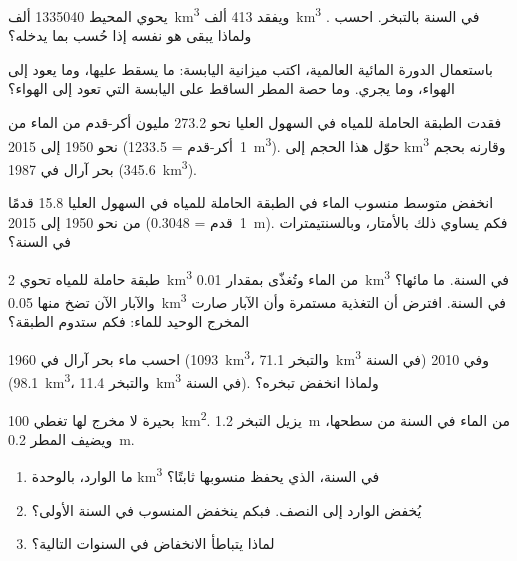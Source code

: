 \begin{exercise}[$\star\star$]\label{exo:g10:freshwater-resources:7}
يحوي المحيط \num{1335040} ألف~\unit{km^3} ويفقد
\num{413} ألف~\unit{km^3} في السنة بالتبخر. احسب . ولماذا يبقى هو نفسه إذا حُسب بما يدخله؟
\end{exercise}

\begin{exercise}[$\star\star$]\label{exo:g10:freshwater-resources:8}
باستعمال  الدورة المائية العالمية، اكتب ميزانية اليابسة: ما
يسقط عليها، وما يعود إلى الهواء، وما يجري. وما حصة المطر
الساقط على اليابسة التي تعود إلى الهواء؟
\end{exercise}

\begin{exercise}[$\star\star$]\label{exo:g10:freshwater-resources:9}
فقدت الطبقة الحاملة للمياه في السهول العليا نحو \num{273.2} مليون أكر-قدم من الماء
من نحو 1950 إلى 2015 (\num{1}~أكر-قدم = \qty{1233.5}{m^3}). حوّل
هذا الحجم إلى \unit{km^3} وقارنه بحجم بحر آرال في
1987 (\qty{345.6}{km^3}).
\end{exercise}

\begin{exercise}[$\star\star$]\label{exo:g10:freshwater-resources:10}
انخفض متوسط منسوب الماء في الطبقة الحاملة للمياه في السهول العليا \num{15.8} قدمًا
من نحو 1950 إلى 2015 (\num{1}~قدم = \qty{0.3048}{m}). فكم يساوي ذلك
بالأمتار، وبالسنتيمترات في السنة؟
\end{exercise}

\begin{exercise}[$\star\star$]\label{exo:g10:freshwater-resources:11}
طبقة حاملة للمياه تحوي \qty{2}{km^3} من الماء وتُغذّى بمقدار
\qty{0.01}{km^3} في السنة. ما  مائها؟ والآبار الآن
تضخ منها \qty{0.05}{km^3} في السنة. افترض أن التغذية مستمرة وأن
الآبار صارت المخرج الوحيد للماء: فكم ستدوم
الطبقة؟
\end{exercise}

\begin{exercise}[$\star\star\star$]\label{exo:g10:freshwater-resources:12}
احسب  ماء بحر آرال في 1960
(\qty{1093}{km^3}، والتبخر \qty{71.1}{km^3} في السنة) وفي 2010
(\qty{98.1}{km^3}، والتبخر \qty{11.4}{km^3} في السنة). ولماذا انخفض
تبخره؟
\end{exercise}

\begin{exercise}[$\star\star\star$]\label{exo:g10:freshwater-resources:13}
بحيرة لا مخرج لها تغطي \qty{100}{km^2}. يزيل التبخر
\qty{1.2}{m} من الماء في السنة من سطحها، ويضيف المطر \qty{0.2}{m}.
\begin{enumerate}
  \item ما الوارد، بالوحدة \unit{km^3} في السنة، الذي يحفظ منسوبها ثابتًا؟
  \item يُخفض الوارد إلى النصف. فبكم ينخفض المنسوب في السنة
        الأولى؟
  \item لماذا يتباطأ الانخفاض في السنوات التالية؟
\end{enumerate}
\end{exercise}

